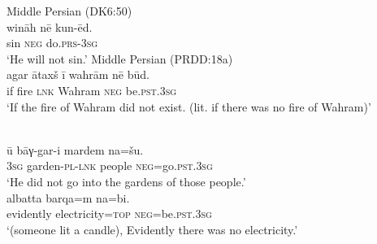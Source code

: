 \documentclass[output=paper,colorlinks,citecolor=brown]{langscibook}
\begin{document}
\begin{exe}\ex\label{ex:ieur-persian-sin-fire}
\begin{xlist}
\ex
Middle Persian (DK6:50)\\
    \gll wināh nē    kun-ēd. \\
sin \textsc{neg} do.\textsc{prs}-\textsc{3sg} \\
    \glt
`He will not sin.'
\ex\label{ex:ieur-persian-fire}
Middle Persian (PRDD:18a)\\
\gll agar ātaxš ī        wahrām  nē     būd.\\
if fire \textsc{lnk} Wahram \textsc{neg}  be.\textsc{pst}.\textsc{3sg}\\ 
\glt `If the fire of Wahram did not exist. (lit. if there was no fire of Wahram)'
\end{xlist}
\ex\begin{xlist}
\ex\label{ex:ieur-sivandi-gardens}
\\
    \gll ū bāγ-gar-i mardem na=šu. \\
\textsc{3sg} garden-\textsc{pl}-\textsc{lnk}   people    \textsc{neg}=go.\textsc{pst}.\textsc{3sg} \\
    \glt `He did not go into the gardens of those people.'
\ex
  \\
\gll albatta   barqa=m      na=bi.\\
evidently electricity=\textsc{top}
\textsc{neg}=be.\textsc{pst}.\textsc{3sg}\\
\glt `(someone lit a candle), Evidently there was no electricity.'
\end{xlist}
\end{exe}
\end{document}
